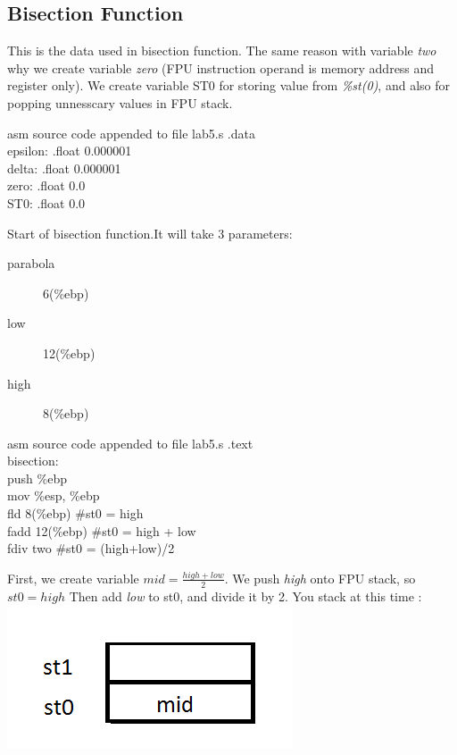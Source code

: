 \documentclass{article}
\begin{document}
\subsection{Bisection Function}
\begin{multicols}{2}
This is the data used in bisection function. The same reason with variable \textit{two} why we create variable \textit{zero} (FPU instruction operand is memory address and register only). We create variable ST0 for storing value from \textit{\%st(0)}, and also for popping unnesscary values in FPU stack.
\begin{GFT}{asm source code appended to file lab5.s}
\+.data\\
\+epsilon: .float 0.000001\\
\+delta: .float 0.000001\\
\+zero: .float 0.0\\
\+ST0: .float 0.0\\
\end{GFT}
Start of bisection function.It will take 3 parameters:
\begin{description}
\item[parabola]  6(\%ebp)
\item[low]  12(\%ebp)
\item[high]  8(\%ebp)
\end{description}
\begin{GFT}{asm source code appended to file lab5.s}
\+.text\\
\+bisection:\\
\+push \%ebp\\
\+mov \%esp, \%ebp\\
\+fld 8(\%ebp) 		\#st0 = high\\
\+fadd 12(\%ebp)		\#st0 = high + low\\
\+fdiv two		\#st0 = (high+low)/2\\
\end{GFT}
First, we create variable \(mid = \frac{high + low}{2}\). We push \textit{high} onto FPU stack, so $st0 = high$ Then add \textit{low} to st0, and divide it by 2. You stack at this time : \\
\includegraphics[scale=0.5]{stack1.png} \\

\end{multicols}
\end{document}
